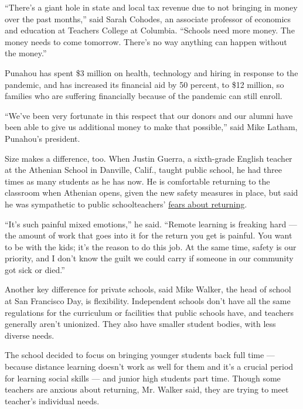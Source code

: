 ``There's a giant hole in state and local tax revenue due to not
bringing in money over the past months,'' said Sarah Cohodes, an
associate professor of economics and education at Teachers College at
Columbia. ``Schools need more money. The money needs to come tomorrow.
There's no way anything can happen without the money.''

Punahou has spent \$3 million on health, technology and hiring in
response to the pandemic, and has increased its financial aid by 50
percent, to \$12 million, so families who are suffering financially
because of the pandemic can still enroll.

``We've been very fortunate in this respect that our donors and our
alumni have been able to give us additional money to make that
possible,'' said Mike Latham, Punahou's president.

Size makes a difference, too. When Justin Guerra, a sixth-grade English
teacher at the Athenian School in Danville, Calif., taught public
school, he had three times as many students as he has now. He is
comfortable returning to the classroom when Athenian opens, given the
new safety measures in place, but said he was sympathetic to public
schoolteachers'
\href{https://www.nytimes3xbfgragh.onion/2020/07/11/us/virus-teachers-classrooms.html}{fears
about returning}.

``It's such painful mixed emotions,'' he said. ``Remote learning is
freaking hard --- the amount of work that goes into it for the return
you get is painful. You want to be with the kids; it's the reason to do
this job. At the same time, safety is our priority, and I don't know the
guilt we could carry if someone in our community got sick or died.''

Another key difference for private schools, said Mike Walker, the head
of school at San Francisco Day, is flexibility. Independent schools
don't have all the same regulations for the curriculum or facilities
that public schools have, and teachers generally aren't unionized. They
also have smaller student bodies, with less diverse needs.

The school decided to focus on bringing younger students back full time
--- because distance learning doesn't work as well for them and it's a
crucial period for learning social skills --- and junior high students
part time. Though some teachers are anxious about returning, Mr. Walker
said, they are trying to meet teacher's individual needs.

\href{https://www.nytimes3xbfgragh.onion/news-event/coronavirus?action=click\&pgtype=Article\&state=default\&region=MAIN_CONTENT_3\&context=storylines_faq}{}

